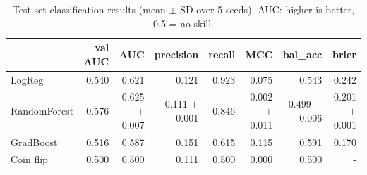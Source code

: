 \begin{table}[h]
\centering
\caption{Test-set classification results (mean $\pm$ SD over 5 seeds). AUC: higher is better, 0.5 = no skill.}
\label{tab:table2_classification}
\small
\begin{tabular}{lrrrrrrr}
\hline
 & val AUC & AUC & precision & recall & MCC & bal\_acc & brier \\
\hline
LogReg & 0.540 & 0.621 & 0.121 & 0.923 & 0.075 & 0.543 & 0.242 \\
RandomForest & 0.576 & 0.625 $\pm$ 0.007 & 0.111 $\pm$ 0.001 & 0.846 & -0.002 $\pm$ 0.011 & 0.499 $\pm$ 0.006 & 0.201 $\pm$ 0.001 \\
GradBoost & 0.516 & 0.587 & 0.151 & 0.615 & 0.115 & 0.591 & 0.170 \\
Coin flip & 0.500 & 0.500 & 0.111 & 0.500 & 0.000 & 0.500 & - \\
\hline
\end{tabular}
\end{table}
